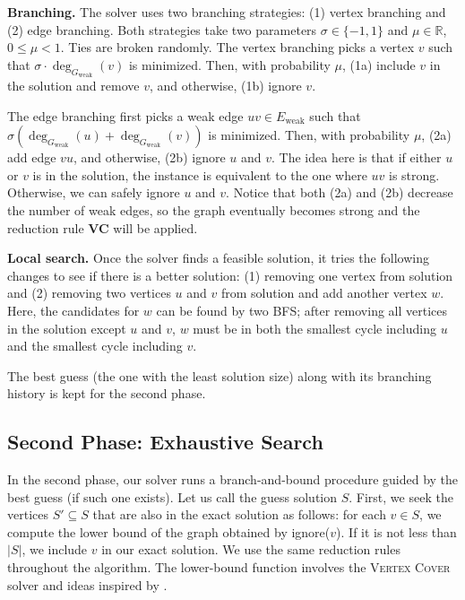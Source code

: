 \documentclass[a4paper,UKenglish,cleveref, autoref, thm-restate]{lipics-v2021}
\begin{document}
\textbf{Branching.} The solver uses two branching strategies: (1) vertex branching and (2) edge branching.
Both strategies take two parameters $\sigma \in \{-1,1\}$ and $\mu \in \mathbb{R}$, $0 \leq \mu < 1$.
Ties are broken randomly.
%
The vertex branching picks a vertex $v$ such that $\sigma \cdot \deg_{G_\text{weak}}(v)$ is minimized.
Then, with probability $\mu$, (1a) include $v$ in the solution and remove $v$, and otherwise, (1b) ignore $v$.

The edge branching first picks a weak edge $uv \in E_\text{weak}$ such that
 $\sigma (\deg_{G_\text{weak}}(u) + \deg_{G_\text{weak}}(v))$ is minimized.
Then, with probability $\mu$, (2a) add edge $vu$, and otherwise, (2b) ignore $u$ and $v$.
%
The idea here is that if either $u$ or $v$ is in the solution, the instance is equivalent to the one where
$uv$ is strong.
Otherwise, we can safely ignore $u$ and $v$.
Notice that both (2a) and (2b) decrease the number of weak edges,
 so the graph eventually becomes strong and the reduction rule \textbf{VC} will be applied.

\textbf{Local search.} Once the solver finds a feasible solution,
 it tries the following changes to see if there is a better solution:
 (1) removing one vertex from solution and
 (2) removing two vertices $u$ and $v$ from solution and add another vertex $w$.
%
Here, the candidates for $w$ can be found by two BFS;
 after removing all vertices in the solution except $u$ and $v$,
 $w$ must be in both the smallest cycle including $u$ and the smallest cycle including $v$.

\vspace*{1em}

The best guess (the one with the least solution size) along with its branching history
 is kept for the second phase.


%
\subsection{Second Phase: Exhaustive Search}

In the second phase, our solver runs a branch-and-bound procedure guided by the best guess (if such one exists).
%
Let us call the guess solution $S$.
First, we seek the vertices $S' \subseteq S$ that are also in the exact solution as follows:
for each $v \in S$, we compute the lower bound of the graph obtained by \textsf{ignore}($v$).
If it is not less than $|S|$, we include $v$ in our exact solution.
We use the same reduction rules throughout the algorithm.
The lower-bound function involves the \textsc{Vertex Cover} solver and
 ideas inspired by \cite{hen-ming_lin_computing_2000}.
\end{document}
